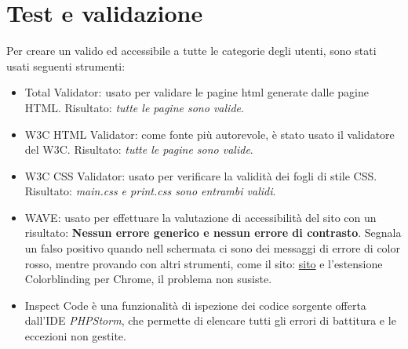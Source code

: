 \documentclass[1_relazione.tex]{subfiles}
\begin{document}
    \section{Test e validazione}\label{sec:test-e-validazione}
    Per creare un valido ed accessibile a tutte le categorie degli utenti, sono stati usati seguenti strumenti:
    \begin{itemize}
        \item{Total Validator}: usato per validare le pagine html generate dalle pagine HTML. Risultato: \textit{tutte le pagine sono valide}.
        \item{W3C HTML Validator}: come fonte pi\`{u} autorevole, \`{e} stato usato il validatore del W3C. Risultato: \textit{tutte le pagine sono valide}.
        \item{W3C CSS Validator}: usato per verificare la validit\`{a} dei fogli di stile CSS. Risultato: \textit{main.css e print.css sono entrambi validi}.
        \item{WAVE}: usato per effettuare la valutazione di accessibilit\`{a} del sito con un risultato: \textbf{Nessun errore generico e nessun errore di contrasto}. Segnala un falso positivo quando nell schermata ci sono dei messaggi di errore di color rosso, mentre provando con altri strumenti, come il sito: \href{https://www.color-blindness.com/coblis-color-blindness-simulator/}{sito} e l'estensione Colorblinding per Chrome, il problema non susiste. 
        \item{Inspect Code} \`{e} una funzionalit\`{a} di ispezione dei codice sorgente offerta dall'IDE \textit{PHPStorm}, che permette di elencare tutti gli errori di battitura e le eccezioni non gestite.        
    \end{itemize}
\end{document}
